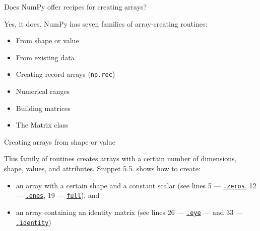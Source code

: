 \documentclass[a4paper,11pt]{book}
\numberwithin{figure}{chapter}
\numberwithin{table}{chapter}
\newcommand{\question}[1]{%
    \begin{tcolorbox}[colback=comp_c!10,colframe=comp_c,sidebyside align=top,width=\linewidth,before skip=1ex]
        #1
    \end{tcolorbox}
    \switchcolumn%
}
\newcommand{\note}[1]{%
    \begin{tcolorbox}[colback=white!0,colframe=white!10,width=\linewidth,before skip=1ex]
        #1
    \end{tcolorbox}
}
\begin{document}
\begin{paracol}{2}
	\question{\raggedright Does NumPy offer recipes for creating arrays?}
	\note{Yes, it does. NumPy has seven families of array-creating routines:
	\begin{itemize}
		\item From shape or value
		\item From existing data
		\item Creating record arrays (\texttt{np.rec})
		\item Numerical ranges
		\item Building matrices
		\item The Matrix class
	\end{itemize}}
\end{paracol}

\begin{paracol}{2}
	\question{\raggedright Creating arrays from shape or value}
	\note{This family of routines creates arrays with a certain number of dimensions, shape, values, and attributes. Snippet 5.5. shows how to create:
	\begin{itemize}
		\item an array with a certain shape and a constant scalar (see lines 5 --- \href{https://numpy.org/doc/stable/reference/generated/numpy.zeros.html\#numpy.zeros}{\texttt{.zeros}}, 12 --- \href{https://numpy.org/doc/stable/reference/generated/numpy.ones.html\#numpy.ones}{\texttt{.ones}}, 19 --- \href{https://numpy.org/doc/stable/reference/generated/numpy.full.html\#numpy.full}{\texttt{full}}), and
		\item an array containing an identity matrix (see lines 26 --- \href{https://numpy.org/doc/stable/reference/generated/numpy.eye.html\#numpy.eye}{\texttt{.eye}} --- and 33 --- \href{https://numpy.org/doc/stable/reference/generated/numpy.identity.html\#numpy.identity}{\texttt{.identity}})
	\end{itemize}} 
\end{paracol}
\clearpage
\end{document}
